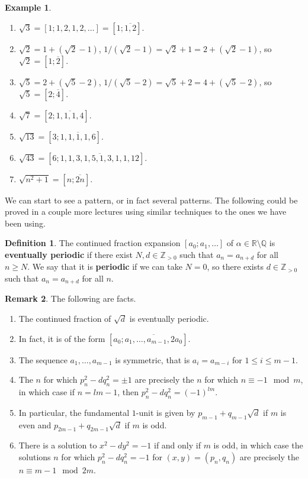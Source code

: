 \documentclass{article}
\newcommand{\Z}{\mathbb{Z}}
\newcommand{\Q}{\mathbb{Q}}
\newcommand{\R}{\mathbb{R}}
\newcommand{\rb}[1]{\left( #1 \right)}
\renewcommand{\sb}[1]{\left[ #1 \right]}
\theoremstyle{definition}\newtheorem{definition}{Definition}
\theoremstyle{definition}\newtheorem{remark}[definition]{Remark}
\theoremstyle{definition}\newtheorem*{example}{Example}
\theoremstyle{definition}\newtheorem*{note}{Note}
\begin{document}
\begin{example}
\hfill
\begin{enumerate}
\item $ \sqrt{3} = \sb{1; 1, 2, 1, 2, \dots} = \sb{1; \overline{1, 2}} $.
\item $ \sqrt{2} = 1 + \rb{\sqrt{2} - 1} $, $ 1 / \rb{\sqrt{2} - 1} = \sqrt{2} + 1 = 2 + \rb{\sqrt{2} - 1} $, so $ \sqrt{2} = \sb{1; \overline{2}} $.
\item $ \sqrt{5} = 2 + \rb{\sqrt{5} - 2} $, $ 1 / \rb{\sqrt{5} - 2} = \sqrt{5} + 2 = 4 + \rb{\sqrt{5} - 2} $, so $ \sqrt{5} = \sb{2; \overline{4}} $.
\item $ \sqrt{7} = \sb{2; \overline{1, 1, 1, 4}} $.
\item $ \sqrt{13} = \sb{3; \overline{1, 1, 1, 1, 6}} $.
\item $ \sqrt{43} = \sb{6; \overline{1, 1, 3, 1, 5, 1, 3, 1, 1, 12}} $.
\item $ \sqrt{n^2 + 1} = \sb{n; \overline{2n}} $.
\end{enumerate}
\end{example}

We can start to see a pattern, or in fact several patterns. The following could be proved in a couple more lectures using similar techniques to the ones we have been using.

\begin{definition}
The continued fraction expansion $ \sb{a_0; a_1, \dots} $ of $ \alpha \in \R \setminus \Q $ is \textbf{eventually periodic} if there exist $ N, d \in \Z_{> 0} $ such that $ a_n = a_{n + d} $ for all $ n \ge N $. We say that it is \textbf{periodic} if we can take $ N = 0 $, so there exists $ d \in \Z_{> 0} $ such that $ a_n = a_{n + d} $ for all $ n $.
\end{definition}

\begin{remark}
The following are facts.
\begin{enumerate}
\item The continued fraction of $ \sqrt{d} $ is eventually periodic.
\item In fact, it is of the form $ \sb{a_0; \overline{a_1, \dots, a_{m - 1}, 2a_0}} $.
\item The sequence $ a_1, \dots, a_{m - 1} $ is symmetric, that is $ a_i = a_{m - i} $ for $ 1 \le i \le m - 1 $.
\item The $ n $ for which $ p_n^2 - dq_n^2 = \pm 1 $ are precisely the $ n $ for which $ n \equiv -1 \mod m $, in which case if $ n = lm - 1 $, then $ p_n^2 - dq_n^2 = \rb{-1}^{lm} $.
\item In particular, the fundamental $ 1 $-unit is given by $ p_{m - 1} + q_{m - 1}\sqrt{d} $ if $ m $ is even and $ p_{2m - 1} + q_{2m - 1}\sqrt{d} $ if $ m $ is odd.
\item There is a solution to $ x^2 - dy^2 = -1 $ if and only if $ m $ is odd, in which case the solutions $ n $ for which $ p_n^2 - dq_n^2 = -1 $ for $ \rb{x, y} = \rb{p_n, q_n} $ are precisely the $ n \equiv m - 1 \mod 2m $.
\end{enumerate}
\end{remark}
\end{document}
